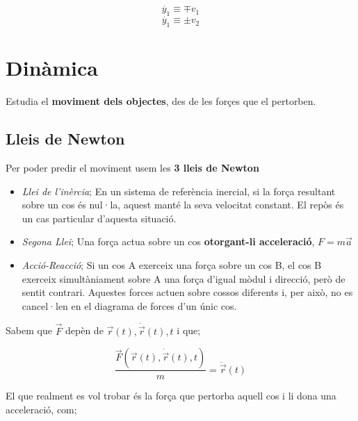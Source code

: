 \documentclass[12pt]{article}
\begin{document}
\[ \dot{y_1} \equiv \mp v_1\]
\[\dot{y_1} \equiv \pm v_2\]

\section{Dinàmica}

Estudia el \textbf{moviment dels objectes}, des de les forçes que el pertorben.

\subsection{Lleis de Newton}

Per poder predir el moviment usem les \textbf{3 lleis de Newton}

\begin{itemize}
    \item \textit{Llei de l'inèrcia}; En un sistema de referència inercial, si la força resultant sobre un cos és nul·la, aquest manté la seva velocitat constant. El repòs és un cas particular d’aquesta situació.
    \item \textit{Segona Llei}; Una força actua sobre un cos \textbf{otorgant-li acceleració}, $F = m\vec{a}$
    \item \textit{Acció-Reacció}; Si un cos A exerceix una força sobre un cos B, el cos B exerceix simultàniament sobre A una força d’igual mòdul i direcció, però de sentit contrari. Aquestes forces actuen sobre cossos diferents i, per això, no es cancel·len en el diagrama de forces d’un únic cos.
\end{itemize}

\begin{center}
\end{center}

Sabem que $\vec{F}$ depèn de $\vec{r}(t), \dot{\vec{r}}(t), t$ i que;

\[\frac{\vec{F}(\vec{r}(t), \dot{\vec{r}}(t), t)}{m} = \ddot{\vec{r}}(t)\]

El que realment es vol trobar és la força que pertorba aquell cos i li dona una acceleració, com;
\end{document}

